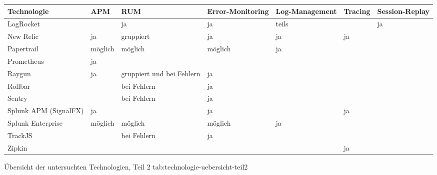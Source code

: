 %
{
\begin{tabular}{|p{2.25cm}|p{1.5cm}|p{2.0cm}|p{3.0cm}|p{3.0cm}|p{1.5cm}|p{2.5cm}|}
\hline
Technologie & APM & RUM & Error-Mo\-ni\-tor\-ing & Log-Management & Tracing & Session-Replay \\
\hline
LogRocket &  & ja & ja & teils &  & ja \\
\hline
New Relic & ja & gruppiert & ja & ja & ja &  \\
\hline
Papertrail & möglich & möglich & möglich & ja &  &  \\
\hline
Prometheus & ja &  &  &  &  &  \\
\hline
Raygun & ja & gruppiert und bei \mbox{Fehlern} & ja &  &  &  \\
\hline
Rollbar &  & bei \mbox{Fehlern} & ja &  &  &  \\
\hline
Sentry &  & bei \mbox{Fehlern} & ja &  &  &  \\
\hline
Splunk APM (SignalFX) & ja &  & ja &  & ja &  \\
\hline
Splunk \mbox{Enterprise} & möglich & möglich & möglich & ja &  &  \\
\hline
TrackJS &  & bei \mbox{Fehlern} & ja &  &  &  \\
\hline
Zipkin &  &  &  &  & ja &  \\
\hline
\end{tabular}
}
{Übersicht der untersuchten Technologien, Teil 2}
{tab:technologie-uebersicht-teil2}